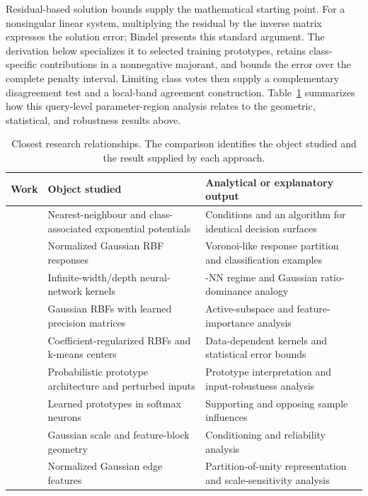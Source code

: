 \documentclass[preprint,12pt,authoryear]{elsarticle}
\begin{document}
Residual-based solution bounds supply the mathematical starting point. For a nonsingular linear system, multiplying the residual by the inverse matrix expresses the solution error; Bindel \citeyearpar{bindel2025} presents this standard argument. The derivation below specializes it to selected training prototypes, retains class-specific contributions in a nonnegative majorant, and bounds the error over the complete penalty interval. Limiting class votes then supply a complementary disagreement test and a local-band agreement construction. Table~\ref{tab:prior} summarizes how this query-level parameter-region analysis relates to the geometric, statistical, and robustness results above.

\begin{table}[!htbp]
\centering\small
\caption{Closest research relationships. The comparison identifies the object studied and the result supplied by each approach.}
\label{tab:prior}
\begin{tabularx}{\textwidth}{@{}>{\raggedright\arraybackslash}p{}>{\raggedright\arraybackslash}X>{\raggedright\arraybackslash}X@{}}
\toprule
Work & Object studied & Analytical or explanatory output \\
\midrule
\citet{srihari1979} & Nearest-neighbour and class-associated exponential potentials & Conditions and an algorithm for identical decision surfaces \\
\citet{bugmann1998} & Normalized Gaussian RBF responses & Voronoi-like response partition and classification examples \\
\citet{radhakrishnan2023} & Infinite-width/depth neural-network kernels & 1-NN regime and Gaussian ratio-dominance analogy \\
\citet{dagostino2024} & Gaussian RBFs with learned precision matrices & Active-subspace and feature-importance analysis \\
\citet{que2016} & Coefficient-regularized RBFs and k-means centers & Data-dependent kernels and statistical error bounds \\
\citet{saralajew2025} & Probabilistic prototype architecture and perturbed inputs & Prototype interpretation and input-robustness analysis \\
\citet{fazaeli2026} & Learned prototypes in softmax neurons & Supporting and opposing sample influences \\
\citet{noorizadegan2026reliable} & Gaussian scale and feature-block geometry & Conditioning and reliability analysis \\
\citet{noorizadegan2026partition} & Normalized Gaussian edge features & Partition-of-unity representation and scale-sensitivity analysis \\

\end{tabularx}
\end{table}
\end{document}
